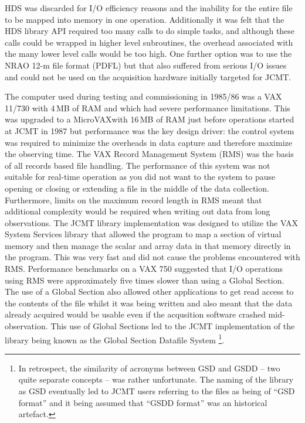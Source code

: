 \documentclass[final,authoryear,5p,times,twocolumn]{elsarticle}
\begin{document}
HDS was discarded for I/O efficiency reasons and the inability for the
entire file to be mapped into memory in one operation. Additionally it
was felt that the HDS library API required too many calls to do simple
tasks, and although these calls could be wrapped in higher level
subroutines, the overhead associated with the many lower level calls
would be too high. One further option was to use the NRAO 12-m file format (PDFL)
but that also suffered from serious I/O issues and could not be used
on the acquisition hardware initially targeted for JCMT.

The computer used during testing and commissioning in 1985/86 was a
VAX 11/730 with 4\,MB of RAM and which had severe performance
limitations. This was upgraded to a MicroVAXwith 16\,MB of RAM just
before operations started at JCMT in 1987 but performance was the key
design driver: the control system was required to minimize the
overheads in data capture and therefore maximize the observing
time. The VAX Record Management System (RMS) was the basis of all
records based file handling. The performance of this system was not
suitable for real-time operation as you did not want to the system to
pause opening or closing or extending a file in the middle of the data
collection. Furthermore, limits on the maximum record length in RMS
meant that additional complexity would be required when writing out
data from long observations. The JCMT library implementation was
designed to utilize the VAX System Services library that allowed the
program to map a section of virtual memory and then manage the scalar
and array data in that memory directly in the program. This was very
fast and did not cause the problems encountered with RMS. Performance
benchmarks on a VAX 750 \citep{mtin33} suggested that I/O operations
using RMS were approximately five times slower than using a Global
Section. The use of a Global Section also allowed other applications
to get read access to the contents of the file whilst it was being
written and also meant that the data already acquired would be usable
even if the acqusition software crashed mid-observation. This use of
Global Sections led to the JCMT implementation of the library being
known as the Global Section Datafile System
\citep[GSD;][]{mtin33}\footnote{In retrospect, the similarity of
  acronyms between GSD and GSDD -- two quite separate concepts -- was
  rather unfortunate. The naming of the library as GSD eventually led
  to JCMT users referring to the files as being of ``GSD format'' and
  it being assumed that ``GSDD format'' was an historical artefact.}.
\end{document}
